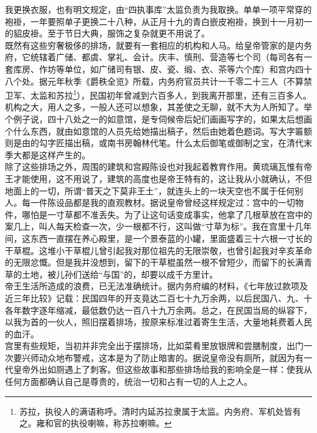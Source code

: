 我更换衣服，也有明文规定，由“四执事库”太监负责为我取换。单单一项平常穿的袍褂，一年要照单子更换二十八种，从正月十九的青白嵌皮袍褂，换到十一月初一的貂皮褂。至于节日大典，服饰之复杂就更不用说了。\\

既然有这些穷奢极侈的排场，就要有一套相应的机构和人马。给皇帝管家的是内务府，它统辖着广储、都虞、掌礼、会计。庆丰、慎刑、营造等七个司（每司各有一套库房、作坊等单位，如广储司有银、皮、瓷、缎、衣、茶等六个库）和宫内四十八个处。据元年秋季《爵秩全览》所载，内务府官员共计一千零二十三人（不算禁卫军、太监和苏拉\footnote{苏拉，执役人的满语称呼。清时内延苏拉隶属于太监。内务府、军机处皆有之。雍和官的执役喇嘛，称苏拉喇嘛。}），民国初年曾减到六百多人，到我离开那里，还有三百多人。机构之大，用人之多，一般人还可以想象，其差使之无聊，就不大为人所知了。举个例子说，四十八处之一的如意馆，是专伺候帝后妃们画画写字的，如果太后想画个什么东西，就由如意馆的人员先给她描出稿子，然后由她着色题词。写大字匾额则是由的勾字匠描出稿，或南书房翰林代笔。什么太后御笔或御制之宝，在清代末季大都是这样产生的。\\

除了这些排场之外，周围的建筑和宫殿陈设也对我起着教育作用。黄琉璃瓦惟有帝王才能使用，这不用说了，建筑的高度也是帝王特有的，这让我从小就确认，不但地面上的一切，所谓“普天之下莫非王土”，就连头上的一块天空也不属于任何别人。每一件陈设品都是我的直观教材。据说皇帝曾经这样规定过：宫中的一切物件，哪怕是一寸草都不准丢失。为了让这句话变成事实，他拿了几根草放在宫中的案几上，叫人每天检查一次，少一根都不行，这叫做“寸草为标”。我在宫里十几年间，这东西一直摆在养心殿里，是一个景泰蓝的小罐，里面盛着三十六根一寸长的干草棍。这堆小干草棍儿曾引起我对那位祖先的无限崇敬，也曾引起我对辛亥革命的无限忿慨。但是我并没想到，留下的干草棍虽然一根不曾短少，而留下的长满青草的土地，被儿孙们送给“与国”的，却要以成千方里计。\\

帝王生活所造成的浪费，已无法准确统计。据内务府编的材料，《七年放过款项及近三年比较》记载：民国四年的开支竟达二百七十九万余两，以后民国八、九、十各年数字逐年缩减，最低数仍达一百八十九万余两。总之，在民国当局的纵容下，以我为首的一伙人，照旧摆着排场，按原来标准过着寄生生活，大量地耗费着人民的血汗。\\

宫里有些规矩，当初并非完全出于摆排场，比如菜肴里放银牌和尝膳制度，出门一次要兴师动众地布警戒，这本是为了防止暗害的。据说皇帝没有厕所，就因为有一代皇帝外出如厕遇上了刺客。但这些故事和那些排场给我的影响全是一样：使我从任何方面都确认自己是尊贵的，统治一切和占有一切的人上之人。
